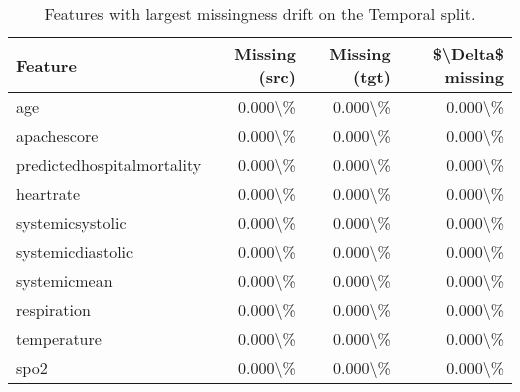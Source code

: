 \begin{table}
\caption{Features with largest missingness drift on the Temporal split.}
\label{tab:missingness-temporal}
\begin{tabular}{lrrr}
\toprule
Feature & Missing (src) & Missing (tgt) & \$\textbackslash Delta\$ missing \\
\midrule
age & 0.000\textbackslash \% & 0.000\textbackslash \% & 0.000\textbackslash \% \\
apachescore & 0.000\textbackslash \% & 0.000\textbackslash \% & 0.000\textbackslash \% \\
predictedhospitalmortality & 0.000\textbackslash \% & 0.000\textbackslash \% & 0.000\textbackslash \% \\
heartrate & 0.000\textbackslash \% & 0.000\textbackslash \% & 0.000\textbackslash \% \\
systemicsystolic & 0.000\textbackslash \% & 0.000\textbackslash \% & 0.000\textbackslash \% \\
systemicdiastolic & 0.000\textbackslash \% & 0.000\textbackslash \% & 0.000\textbackslash \% \\
systemicmean & 0.000\textbackslash \% & 0.000\textbackslash \% & 0.000\textbackslash \% \\
respiration & 0.000\textbackslash \% & 0.000\textbackslash \% & 0.000\textbackslash \% \\
temperature & 0.000\textbackslash \% & 0.000\textbackslash \% & 0.000\textbackslash \% \\
spo2 & 0.000\textbackslash \% & 0.000\textbackslash \% & 0.000\textbackslash \% \\
\bottomrule
\end{tabular}
\end{table}
